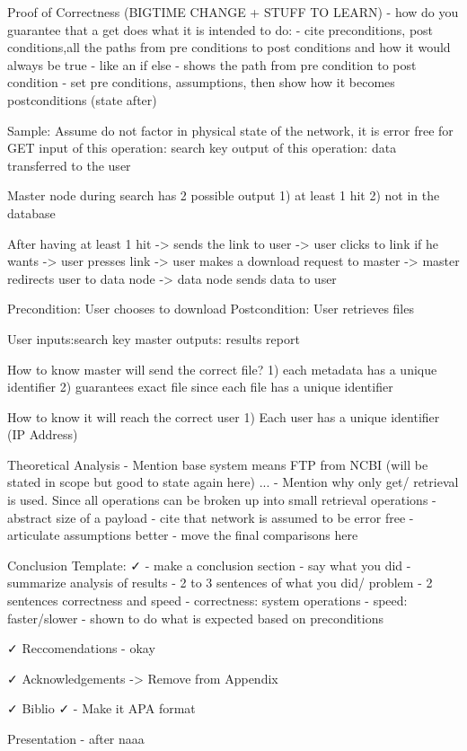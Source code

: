 Proof of Correctness (BIGTIME CHANGE + STUFF TO LEARN)
- how do you guarantee that a get does what it is intended to do:
- cite preconditions, post conditions,all the paths from pre conditions to post conditions and how it would always be true
- like an if else
- shows the path from pre condition to post condition
- set pre conditions, assumptions, then show how it becomes postconditions (state after)


Sample:
Assume do not factor in physical state of the network, it is error free
for GET
input of this operation: search key
output of this operation: data transferred to the user

Master node during search has 2 possible output
1) at least 1 hit
2) not in the database

After having at least 1 hit
-> sends the link to user
-> user clicks to link if he wants
-> user presses link
-> user makes a download request to master
-> master redirects user to data node
-> data node sends data to user

Precondition: User chooses to download
Postcondition: User retrieves files

User inputs:search key
master outputs: results report

How to know master will send the correct file?
1) each metadata has a unique identifier
2) guarantees exact file since each file has a unique identifier

How to know it will reach the correct user
1) Each user has a unique identifier (IP Address)

Theoretical Analysis
- Mention base system means FTP from NCBI (will be stated in scope but good to state again here) ...
- Mention why only get/ retrieval is used. Since all operations can be broken up into small retrieval operations
- abstract size of a payload
- cite that network is assumed to be error free
- articulate assumptions better
- move the final comparisons here

Conclusion Template:
✓ - make a conclusion section
- say what you did
- summarize analysis of results
- 2 to 3 sentences of what you did/ problem
- 2 sentences correctness and speed
- correctness: system operations
- speed: faster/slower
- shown to do what is expected based on preconditions

✓ Reccomendations
- okay

✓ Acknowledgements -> Remove from Appendix

✓ Biblio
✓ - Make it APA format

Presentation - after naaa